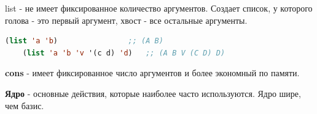 list - не имеет фиксированное количество аргументов. 
Создает список, у которого голова - это первый аргумент,
хвост - все остальные аргументы.
\begin{lstlisting}[language=Lisp]
	(list 'a 'b) 				;; (A B)
	(list 'a 'b 'v '(c d) 'd) 	;; (A B V (C D) D)
\end{lstlisting}

\begin{figure}[ht!]
\end{figure}

\textbf{cons} - имеет фиксированное число аргументов и более экономный по памяти.

\textbf{Ядро} - основные действия, которые наиболее часто используются. Ядро шире, чем базис.
